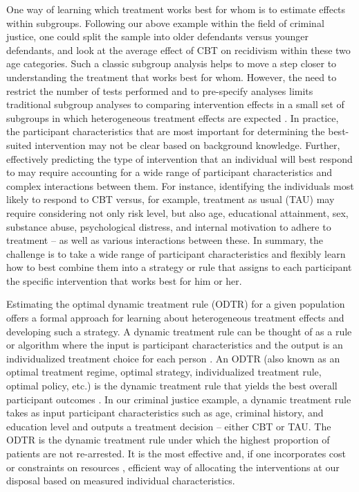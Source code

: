 \documentclass[a4paper,12pt]{article}
\begin{document}
One way of learning which treatment works best for whom is to estimate effects within subgroups. Following our above example within the field of criminal justice, one could split the sample into older defendants versus younger defendants, and look at the average effect of CBT on recidivism within these two age categories. Such a classic subgroup analysis helps to move a step closer to understanding the treatment that works best for whom. However, the need to restrict the number of tests performed and to pre-specify analyses limits traditional subgroup analyses to comparing intervention effects in a small set of subgroups in which heterogeneous treatment effects are expected \citep{kent2018personalized, lipkovich2017tutorial}. In practice, the participant characteristics that are most important for determining the best-suited intervention may not be clear based on background knowledge. Further, effectively predicting the type of intervention that an individual will best respond to may require accounting for a wide range of participant characteristics and complex interactions between them. For instance, identifying the individuals most likely to respond to CBT versus, for example, treatment as usual (TAU) may require considering not only risk level, but also age, educational attainment, sex, substance abuse, psychological distress, and internal motivation to adhere to treatment -- as well as various interactions between these. In summary, the challenge is to take a wide range of participant characteristics and flexibly learn how to best combine them into a strategy or rule that assigns to each participant the specific intervention that works best for him or her.

Estimating the optimal dynamic treatment rule (ODTR) for a given population offers a formal approach for learning about heterogeneous treatment effects and developing such a strategy. A dynamic treatment rule can be thought of as a rule or algorithm where the input is participant characteristics and the output is an individualized treatment choice for each person \citep{bembomvdL2007practical, van2007causal, robins1986new, chakraborty2013statistical}. An ODTR (also known as an optimal treatment regime, optimal strategy, individualized treatment rule, optimal policy, etc.) is the dynamic treatment rule that yields the best overall participant outcomes \citep{murphy2003optimal, robins2004optimal}. In our criminal justice example, a dynamic treatment rule takes as input participant characteristics such as age, criminal history, and education level and outputs a treatment decision -- either CBT or TAU. The ODTR is the dynamic treatment rule under which the highest proportion of patients are not re-arrested. It is the most effective and, if one incorporates cost or constraints on resources \citep{luedtke2016optimal}, efficient way of allocating the interventions at our disposal based on measured individual characteristics. 
\end{document}
